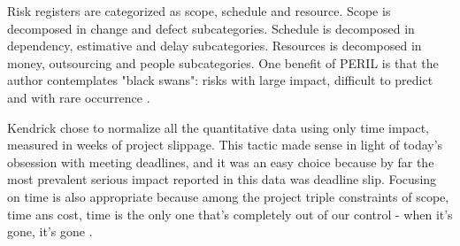 Risk registers are categorized as scope, schedule and resource. Scope is decomposed in change and defect subcategories. Schedule is decomposed in dependency, estimative and delay subcategories. Resources is decomposed in money, outsourcing and people subcategories. One benefit of PERIL is that the author contemplates "black swans": risks with large impact, difficult to predict and with rare occurrence \cite{taleb2001fooled}. 

Kendrick chose to normalize all the quantitative data using only time impact, measured in weeks of project slippage. This tactic made sense in light of today's obsession with meeting deadlines, and it was an easy choice because by far the most prevalent serious impact reported in this data was deadline slip. Focusing on time is also appropriate because among the project triple constraints of scope, time ans cost, time is the only one that's completely out of our control - when it's gone, it's gone \cite{KEND2003BOOK}.

